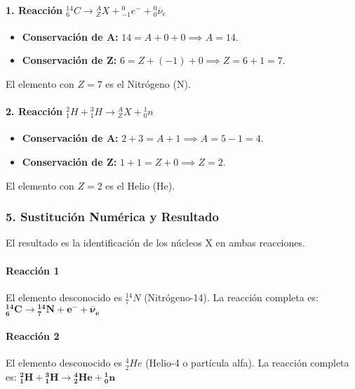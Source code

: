\paragraph*{1. Reacción ${}_{6}^{14}C \rightarrow {}_{Z}^{A}X + {}_{-1}^{0}e^{-} + {}_{0}^{0}\overline{\nu}_e$}
\begin{itemize}
    \item \textbf{Conservación de A:} $14 = A + 0 + 0 \implies A = 14$.
    \item \textbf{Conservación de Z:} $6 = Z + (-1) + 0 \implies Z = 6 + 1 = 7$.
\end{itemize}
El elemento con $Z=7$ es el Nitrógeno (N).

\paragraph*{2. Reacción ${}_{1}^{2}H + {}_{1}^{3}H \rightarrow {}_{Z}^{A}X + {}_{0}^{1}n$}
\begin{itemize}
    \item \textbf{Conservación de A:} $2 + 3 = A + 1 \implies A = 5 - 1 = 4$.
    \item \textbf{Conservación de Z:} $1 + 1 = Z + 0 \implies Z = 2$.
\end{itemize}
El elemento con $Z=2$ es el Helio (He).

\subsubsection*{5. Sustitución Numérica y Resultado}
El resultado es la identificación de los núcleos X en ambas reacciones.

\paragraph*{Reacción 1}
\begin{cajaresultado}
    El elemento desconocido es ${}_{7}^{14}N$ (Nitrógeno-14). La reacción completa es:
    $\boldsymbol{{}_{6}^{14}C \rightarrow {}_{7}^{14}N + e^{-} + \overline{\nu}_e}$
\end{cajaresultado}

\paragraph*{Reacción 2}
\begin{cajaresultado}
    El elemento desconocido es ${}_{2}^{4}He$ (Helio-4 o partícula alfa). La reacción completa es:
    $\boldsymbol{{}_{1}^{2}H + {}_{1}^{3}H \rightarrow {}_{2}^{4}He + {}_{0}^{1}n}$
\end{cajaresultado}

